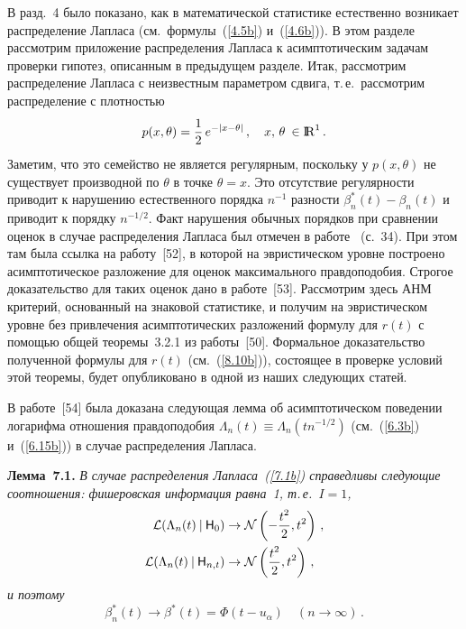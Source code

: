 \begin{multicols}{2}
В разд.~4 было показано, как в
математической статистике естественно возникает распределение
Лапласа (см.\ формулы~(\ref{4.5b}) и~(\ref{4.6b})). В этом разделе рассмотрим
приложение распределения Лапласа к асимптотическим задачам
проверки гипотез, описанным в предыдущем разделе. Итак, рассмотрим
распределение Лапласа с неизвестным параметром сдвига, т.\,е.\
рассмотрим распределение с плот\-ностью
\begin{equation}
p(x,\theta) = \displaystyle\frac{\displaystyle 1\mathstrut}{\displaystyle 2\mathstrut}\,e^{-|x - \theta|}\,, \quad x,\,\theta\:\in{\rm I\hspace{-0.7mm}\rm R}^1\,.
\label{7.1b}
\end{equation}
Заметим, что это семейство не является
регулярным, поскольку у $p(x,\theta)$ не существует производной по
$\theta$ в точке $\theta=x$. Это отсутствие регулярности приводит
к нарушению естественного порядка $n^{-1}$ разности
${\beta}_n^*(t)-\beta_n(t)$ и приводит к порядку $n^{-1/2}$.
Факт нарушения обычных порядков при сравнении оценок в случае
распределения Лапласа был отмечен в работе~\cite{51be} (с.~34). При
этом там была ссылка на работу~[52], в которой на эвристическом
уровне построено асимптотическое разложение для оценок
максимального правдоподобия. Строгое доказательство для таких
оценок дано в работе~[53]. Рассмотрим здесь АНМ критерий,
основанный на знаковой статистике, и получим на эвристическом
уровне без привлечения асимптотических разложений формулу для
$r(t)$ с помощью общей теоремы~3.2.1 из работы~[50]. 
Формальное доказательство полученной формулы для $r(t)$ (см.~(\ref{8.10b})),
состоящее в проверке условий этой теоремы, будет опубликовано в
одной из наших следующих статей.

В работе~[54] была доказана следующая лемма
 об асимптотическом поведении логарифма отношения
правдоподобия $\Lambda_n(t) \equiv \Lambda_n(tn^{-1/2})$ (см.~(\ref{6.3b}) 
и~(\ref{6.15b})) в случае распределения Лапласа.

\vspace*{2pt}

\noindent
{\bf Лемма~7.1.} {\it В случае распределения Лапласа~(\ref{7.1b})
справедливы следующие соотношения: фишеровская информация равна~1,
т.\,е.\ $I=1$,
\begin{align*}
{\cal L}(\Lambda_n(t)\:|\:{\sf H}_0) & \to
{\cal N}\left (-\displaystyle\frac{\displaystyle t^2\mathstrut}{\displaystyle 2\mathstrut}, t^2\right )\,,\\
{\cal L}(\Lambda_n(t)\:|\:{\sf H}_{n,t}) & \to {\cal N}\left(
\displaystyle\frac{\displaystyle t^2\mathstrut}{\displaystyle 2\mathstrut}, t^2\right )\,,
\end{align*}
и поэтому}
$$
\beta_n^*(t) \to \beta^*(t)=\Phi(t-u_\alpha) \quad
(n \to \infty)\,.
$$ 
\pagebreak


\end{multicols}
